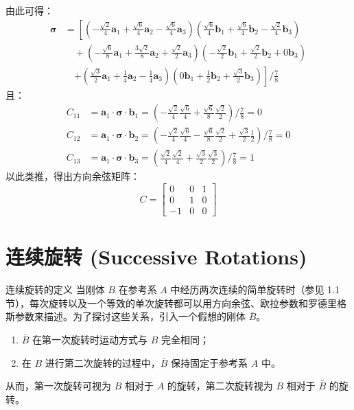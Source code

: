 由此可得：
\begin{align}
\boldsymbol{\sigma} &= \left[ \left( -\frac{\sqrt{2}}{4} \mathbf{a}_1 + \frac{\sqrt{6}}{4} \mathbf{a}_2 - \frac{\sqrt{6}}{4} \mathbf{a}_3 \right) \left( \frac{\sqrt{6}}{4} \mathbf{b}_1 + \frac{\sqrt{6}}{4} \mathbf{b}_2 - \frac{\sqrt{2}}{4} \mathbf{b}_3 \right) \right. \nonumber \\
&\quad + \left( -\frac{\sqrt{6}}{8} \mathbf{a}_1 + \frac{3\sqrt{2}}{8} \mathbf{a}_2 + \frac{\sqrt{2}}{2} \mathbf{a}_3 \right) \left( -\frac{\sqrt{2}}{2} \mathbf{b}_1 + \frac{\sqrt{2}}{2} \mathbf{b}_2 + 0\mathbf{b}_3 \right) \nonumber \\
&\quad \left. + \left( \frac{\sqrt{3}}{2} \mathbf{a}_1 + \frac{1}{4} \mathbf{a}_2 - \frac{1}{4} \mathbf{a}_3 \right) \left( 0\mathbf{b}_1 + \frac{1}{2} \mathbf{b}_2 + \frac{\sqrt{3}}{2} \mathbf{b}_3 \right) \right] \Bigg/ \frac{7}{8} \tag{13}
\end{align}
且：
\begin{align}
C_{11} &= \mathbf{a}_1 \cdot \boldsymbol{\sigma} \cdot \mathbf{b}_1 = \left( -\frac{\sqrt{2}}{4} \frac{\sqrt{6}}{4} + \frac{\sqrt{6}}{8} \frac{\sqrt{2}}{2} \right) \Bigg/ \frac{7}{8} = 0 \tag{14} \\
C_{12} &= \mathbf{a}_1 \cdot \boldsymbol{\sigma} \cdot \mathbf{b}_2 = \left( -\frac{\sqrt{2}}{4} \frac{\sqrt{6}}{4} - \frac{\sqrt{6}}{8} \frac{\sqrt{2}}{2} + \frac{\sqrt{3}}{2} \frac{1}{2} \right) \Bigg/ \frac{7}{8} = 0 \tag{15} \\
C_{13} &= \mathbf{a}_1 \cdot \boldsymbol{\sigma} \cdot \mathbf{b}_3 = \left( \frac{\sqrt{2}}{4} \frac{\sqrt{2}}{4} + \frac{\sqrt{3}}{2} \frac{\sqrt{3}}{2} \right) \Bigg/ \frac{7}{8} = 1 \tag{16}
\end{align}
以此类推，得出方向余弦矩阵：
\begin{equation}
C = \begin{bmatrix} 0 & 0 & 1 \\ 0 & 1 & 0 \\ -1 & 0 & 0 \end{bmatrix} \tag{17}
\end{equation}


\section{连续旋转 (Successive Rotations)}

\begin{mydefinition}{连续旋转的定义}
    当刚体 \(B\) 在参考系 \(A\) 中经历两次连续的简单旋转时（参见 1.1 节），每次旋转以及一个等效的单次旋转都可以用方向余弦、欧拉参数和罗德里格斯参数来描述。为了探讨这些关系，引入一个假想的刚体 \(\bar{B}\)。
    \begin{enumerate}
        \item \(\bar{B}\) 在第一次旋转时运动方式与 \(B\) 完全相同；
        \item 在 \(B\) 进行第二次旋转的过程中，\(\bar{B}\) 保持固定于参考系 \(A\) 中。
    \end{enumerate}
    从而，第一次旋转可视为 \(B\) 相对于 \(A\) 的旋转，第二次旋转视为 \(B\) 相对于 \(\bar{B}\) 的旋转。
\end{mydefinition}

